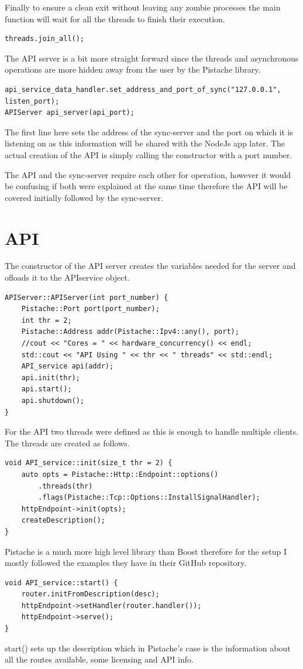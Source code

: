 Finally to ensure a clean exit without leaving any zombie processes the main function will wait for all the threads to finish their execution.
\begin{lstlisting}
threads.join_all();
\end{lstlisting}

The API server is a bit more straight forward since the threads and asynchronous operations are more hidden away from the user by the Pistache library. 
\begin{lstlisting}
api_service_data_handler.set_address_and_port_of_sync("127.0.0.1", listen_port);
APIServer api_server(api_port);
\end{lstlisting}
The first line here sets the address of the sync-server and the port on which it is listening on as this information will be shared with the NodeJs app later. 
The actual creation of the API is simply calling the constructor with a port number.

The API and the sync-server require each other for operation, however it would be confusing if both were explained at the same time therefore the API will be covered initially followed by the sync-server.

\section{API}
The constructor of the API server creates the variables needed for the server and ofloads it to the APIservice object.
\begin{lstlisting}
APIServer::APIServer(int port_number) {
    Pistache::Port port(port_number);
    int thr = 2;
    Pistache::Address addr(Pistache::Ipv4::any(), port);
    //cout << "Cores = " << hardware_concurrency() << endl;
    std::cout << "API Using " << thr << " threads" << std::endl;
    API_service api(addr);
    api.init(thr);
    api.start();
    api.shutdown();
}
\end{lstlisting}
For the API two threads were defined as this is enough to handle multiple clients.
The threads are created as follows.
\begin{lstlisting}
void API_service::init(size_t thr = 2) {
    auto opts = Pistache::Http::Endpoint::options()
        .threads(thr)
        .flags(Pistache::Tcp::Options::InstallSignalHandler);
    httpEndpoint->init(opts);
    createDescription();
}
\end{lstlisting}
Pistache is a much more high level library than Boost therefore for the setup I mostly followed the examples they have in their GitHub repository.
\begin{lstlisting}
void API_service::start() {
    router.initFromDescription(desc);
    httpEndpoint->setHandler(router.handler());
    httpEndpoint->serve();
}
\end{lstlisting}
start() sets up the description which in Pistache's case is the information about all the routes available, some licensing and API info.  

